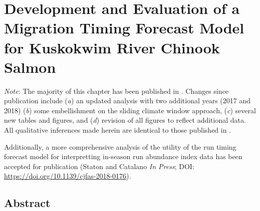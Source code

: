 \documentclass[12pt,]{book}
\theoremstyle{definition}
\theoremstyle{definition}
\theoremstyle{definition}
\theoremstyle{remark}
\begin{document}
\setlength{\parskip}{0pt plus 0pt minus 0pt}

\doublespacing

\chapter{Development and Evaluation of a Migration Timing Forecast Model
for Kuskokwim River Chinook Salmon}\label{ch2}

\singlespacing
\noindent
\footnotesize
\textit{Note}: The majority of this chapter has been published in
\cite{staton-etal-2017-rtf}. Changes since publication include
(\textit{a}) an updated analysis with two additional years (2017 and
2018) (\textit{b}) some embellishment on the sliding climate window
approach, (\textit{c}) several new tables and figures, and (\textit{d})
revision of all figures to reflect additional data. All qualitative
inferences made herein are identical to those published in
\cite{staton-etal-2017-rtf}.

\vspace{0.25cm}

\noindent
Additionally, a more comprehensive analysis of the utility of the run
timing forecast model for interpretting in-season run abundance index
data has been accepted for publication (Staton and Catalano
\textit{In Press}; DOI: \url{https://doi.org/10.1139/cjfas-2018-0176}).
\singlespacing

\normalsize
\doublespacing

\section*{Abstract}\label{abstract}
\end{document}
